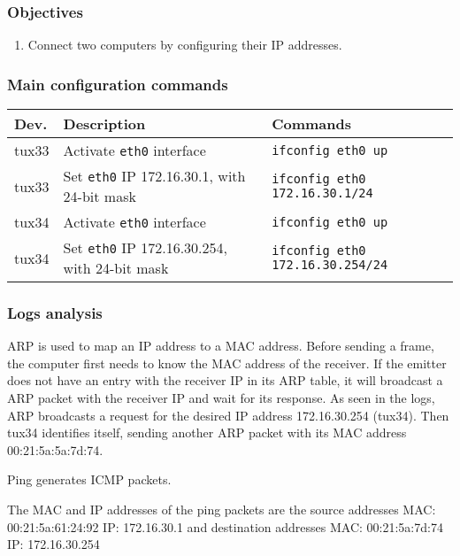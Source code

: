 \documentclass[a4paper, 11pt]{report}
\begin{document}
\subsubsection{Objectives} \label{sec:Obj1}

\begin{enumerate}
    \item Connect two computers by configuring their IP addresses.
\end{enumerate}

\subsubsection{Main configuration commands} \label{sec:Com1}

\begin{tabular}{l | p{75mm} | l}
    \textbf{Dev.} & \textbf{Description}                                  & \textbf{Commands}                       \\ \hline
    tux33         & Activate \texttt{eth0} interface                     & \texttt{ifconfig eth0 up}               \\
    tux33         & Set \texttt{eth0} IP 172.16.30.1, with 24-bit mask   & \texttt{ifconfig eth0 172.16.30.1/24}   \\ \hline
    tux34         & Activate \texttt{eth0} interface                     & \texttt{ifconfig eth0 up}               \\
    tux34         & Set \texttt{eth0} IP 172.16.30.254, with 24-bit mask & \texttt{ifconfig eth0 172.16.30.254/24} \\
\end{tabular}

\subsubsection{Logs analysis} \label{sec:Log1}

ARP is used to map an IP address to a MAC address.
Before sending a frame, the computer first needs to know the MAC address of the receiver.
If the emitter does not have an entry with the receiver IP in its ARP table, it will broadcast a ARP packet with the receiver IP and wait for its response.
As seen in the logs, ARP broadcasts a request for the desired IP address 172.16.30.254 (tux34).
Then tux34 identifies itself, sending another ARP packet with its MAC address 00:21:5a:5a:7d:74.

Ping generates ICMP packets.

The MAC and IP addresses of the ping packets are the source addresses MAC: 00:21:5a:61:24:92 IP: 172.16.30.1
and destination addresses MAC: 00:21:5a:7d:74 IP: 172.16.30.254
\end{document}
